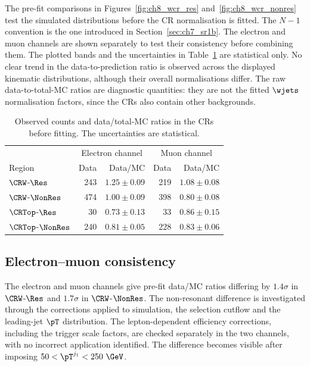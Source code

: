 The pre-fit comparisons in Figures~\ref{fig:ch8_wcr_res} and~\ref{fig:ch8_wcr_nonres} test the simulated distributions before the CR normalisation is fitted.
The $N-1$ convention is the one introduced in Section~\ref{sec:ch7_sr1b}.
The electron and muon channels are shown separately to test their consistency before combining them.
The plotted bands and the uncertainties in Table~\ref{tab:ch8_cr_prefit} are statistical only.
No clear trend in the data-to-prediction ratio is observed across the displayed kinematic distributions, although their overall normalisations differ.
The raw data-to-total-MC ratios are diagnostic quantities: they are not the fitted $\wjets$ normalisation factors, since the CRs also contain other backgrounds.

\begin{table}[htbp]
    \centering
    \small
    \caption{Observed counts and data/total-MC ratios in the CRs before fitting. The uncertainties are statistical.}
    \label{tab:ch8_cr_prefit}
    \begin{tabular}{lrrrr}
        \toprule
         & \multicolumn{2}{c}{Electron channel} & \multicolumn{2}{c}{Muon channel} \\
        Region & Data & Data/MC & Data & Data/MC \\
        \midrule
        $\CRW$-$\Res$ & 243 & $1.25\pm0.09$ & 219 & $1.08\pm0.08$ \\
        $\CRW$-$\NonRes$ & 474 & $1.00\pm0.09$ & 398 & $0.80\pm0.08$ \\
        $\CRTop$-$\Res$ & 30 & $0.73\pm0.13$ & 33 & $0.86\pm0.15$ \\
        $\CRTop$-$\NonRes$ & 240 & $0.81\pm0.05$ & 228 & $0.83\pm0.06$ \\
        \bottomrule
    \end{tabular}
\end{table}


\clearpage
\subsection{Electron--muon consistency}
\label{subsec:ch8_emu}

The electron and muon channels give pre-fit data/MC ratios differing by $1.4\sigma$ in $\CRW$-$\Res$ and $1.7\sigma$ in $\CRW$-$\NonRes$.
The non-resonant difference is investigated through the corrections applied to simulation, the selection cutflow and the leading-jet $\pT$ distribution.
The lepton-dependent efficiency corrections, including the trigger scale factors, are checked separately in the two channels, with no incorrect application identified.
The difference becomes visible after imposing $50<\pT^{j_1}<250~\GeV$.

